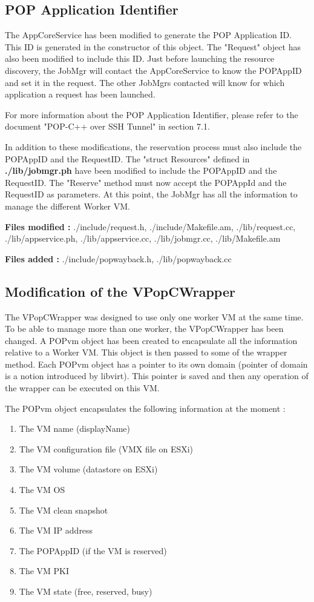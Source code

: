 \pagebreak
%
%
\subsection{POP Application Identifier}
The AppCoreService has been modified to generate the POP Application ID. This ID is generated in the constructor of this object. The "Request" object has also been modified to include this ID. Just before launching the resource discovery, the JobMgr will contact the AppCoreService to know the POPAppID and set it in the request. The other JobMgrs contacted will know for which application a request has been launched. \s

For more information about the POP Application Identifier, please refer to the document "POP-C++ over SSH Tunnel"\cite{popcssh} in section 7.1.\s

In addition to these modifications, the reservation process must also include the POPAppID and the RequestID. The "struct Resources" defined in \textbf{./lib/jobmgr.ph} have been modified to include the POPAppID and the RequestID. The "Reserve" method must now accept the POPAppId and the RequestID as parameters. At this point, the JobMgr has all the information to manage the different Worker VM.\s

\textbf{Files modified : } ./include/request.h, ./include/Makefile.am, ./lib/request.cc, ./lib/appservice.ph, ./lib/appservice.cc, ./lib/jobmgr.cc, ./lib/Makefile.am\s

\textbf{Files added : } ./include/popwayback.h, ./lib/popwayback.cc



\subsection{Modification of the VPopCWrapper}
\label{lb:wrapper}
The VPopCWrapper was designed to use only one worker VM at the same time. To be able to manage more than one worker, the VPopCWrapper has been changed. A POPvm object has been created to encapsulate all the information relative to a Worker VM. This object is then passed to some of the wrapper method. Each POPvm object has a pointer to its own domain (pointer of domain is a notion introduced by libvirt). This pointer is saved and then any operation of the wrapper can be executed on this VM. \s

The POPvm object encapsulates the following information at the moment : \s
\begin{enumerate}
\item The VM name (displayName)
\item The VM configuration file (VMX file on ESXi)
\item The VM volume (datastore on ESXi)
\item The VM OS
\item The VM clean snapshot
\item The VM IP address
\item The POPAppID (if the VM is reserved)
\item The VM PKI 
\item The VM state (free, reserved, busy)
\end{enumerate} 


